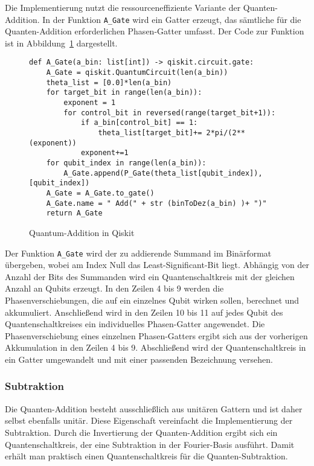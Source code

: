 Die Implementierung nutzt die ressourceneffiziente Variante der Quanten-Addition.
In der Funktion \texttt{A\_Gate} wird ein Gatter erzeugt, 
das sämtliche für die Quanten-Addition erforderlichen Phasen-Gatter umfasst.
Der Code zur Funktion ist in Abbildung~\ref{code:QuantumAdd} dargestellt.
\begin{figure}[H]
  \caption{Quantum-Addition in Qiskit}
  \label{code:QuantumAdd}
\begin{verbatim}    
def A_Gate(a_bin: list[int]) -> qiskit.circuit.gate:
    A_Gate = qiskit.QuantumCircuit(len(a_bin))
    theta_list = [0.0]*len(a_bin)
    for target_bit in range(len(a_bin)):
        exponent = 1
        for control_bit in reversed(range(target_bit+1)):
            if a_bin[control_bit] == 1:
                theta_list[target_bit]+= 2*pi/(2**(exponent))
            exponent+=1
    for qubit_index in range(len(a_bin)):
        A_Gate.append(P_Gate(theta_list[qubit_index]),[qubit_index])
    A_Gate = A_Gate.to_gate()
    A_Gate.name = " Add(" + str (binToDez(a_bin) )+ ")"
    return A_Gate 
  \end{verbatim}
\end{figure}
Der Funktion \texttt{A\_Gate} wird der zu addierende Summand im Binärformat übergeben, 
wobei am Index Null das Least-Significant-Bit liegt.
Abhängig von der Anzahl der Bits des Summanden wird ein Quantenschaltkreis mit der gleichen Anzahl an Qubits erzeugt. 
In den Zeilen 4 bis 9 werden die Phasenverschiebungen, die auf ein einzelnes Qubit wirken sollen, berechnet und akkumuliert.
Anschließend wird in den Zeilen 10 bis 11 auf jedes Qubit des Quantenschaltkreises ein individuelles Phasen-Gatter angewendet.
Die Phasenverschiebung eines einzelnen Phasen-Gatters ergibt sich aus der vorherigen Akkumulation in den Zeilen 4 bis 9.
Abschließend wird der Quantenschaltkreis in ein Gatter umgewandelt und mit einer passenden Bezeichnung versehen.

\subsubsection{Subtraktion}
Die Quanten-Addition besteht ausschließlich aus unitären Gattern und ist daher selbst ebenfalls unitär.
Diese Eigenschaft vereinfacht die Implementierung der Subtraktion. 
Durch die Invertierung der Quanten-Addition ergibt sich ein Quantenschaltkreis, 
der eine Subtraktion in der Fourier-Basis ausführt. 
Damit erhält man praktisch einen Quantenschaltkreis für die Quanten-Subtraktion.

